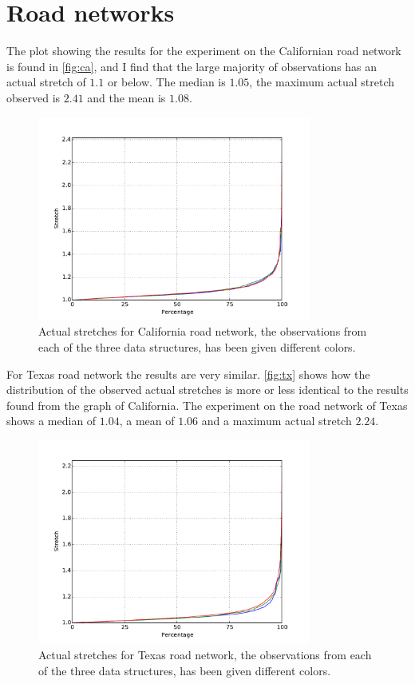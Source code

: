 \section{Road networks}
The plot showing the results for the experiment on the Californian road
network is found in \autoref{fig:ca}, and I find that the large majority of
observations has an actual stretch of $1.1$ or below. The median is $1.05$, the
maximum actual stretch observed is $2.41$ and the mean is $1.08$.
\begin{figure}[htbp]
    \centering
    \includegraphics[width=0.8\textwidth]{plots/roadnet_ca.pdf}
    \caption{Actual stretches for California road network, the observations
    from each of the three data structures, has been given different colors.}
    \label{fig:ca}
\end{figure}

For Texas road network the results are very similar. \autoref{fig:tx}
shows how the distribution of the observed actual stretches is more or less
identical to the results found from the graph of California. The experiment
on the road network of Texas shows a median of $1.04$, a mean of $1.06$ and a
maximum actual stretch $2.24$.
\begin{figure}[htbp]
    \centering
    \includegraphics[width=0.8\textwidth]{plots/roadnet_tx.pdf}
    \caption{Actual stretches for Texas road network, the observations
    from each of the three data structures, has been given different colors.}
    \label{fig:tx}
\end{figure}

